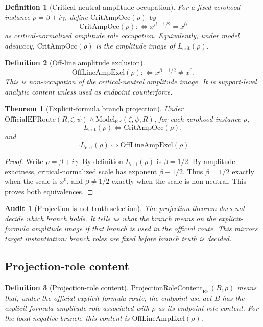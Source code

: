 \documentclass[11pt]{article}
\newtheorem{definition}{Definition}[section]
\newtheorem{theorem}{Theorem}[section]
\newtheorem{audit}{Audit}[section]
\newcommand{\Lcrit}{L_{\mathrm{crit}}}
\newcommand{\ModelEF}{\mathrm{Model}_{\mathrm{EF}}}
\newcommand{\OfficialEFRoute}{\mathrm{OfficialEFRoute}}
\newcommand{\CritAmpOcc}{\mathrm{CritAmpOcc}}
\newcommand{\OffAmpExcl}{\mathrm{OffLineAmpExcl}}
\newcommand{\ProjRoleEF}{\mathrm{ProjectionRoleContent}_{\mathrm{EF}}}
\begin{document}
\begin{definition}[Critical-neutral amplitude occupation]
For a fixed zerohood instance \(\rho=\beta+i\gamma\), define \(\CritAmpOcc(\rho)\) by
\[
\CritAmpOcc(\rho) :\Longleftrightarrow x^{\beta-1/2}=x^0
\]
as critical-normalized amplitude role occupation.  Equivalently, under model adequacy, \(\CritAmpOcc(\rho)\) is the amplitude image of \(\Lcrit(\rho)\).
\end{definition}

\begin{definition}[Off-line amplitude exclusion]
\[
\OffAmpExcl(\rho):\Longleftrightarrow x^{\beta-1/2}\ne x^0.
\]
This is non-occupation of the critical-neutral amplitude image.  It is support-level analytic content unless used as endpoint counterforce.
\end{definition}

\begin{theorem}[Explicit-formula branch projection]
Under \(\OfficialEFRoute(R,\zeta,\psi)\wedge \ModelEF(\zeta,\psi,R)\), for each zerohood instance \(\rho\),
\[
\Lcrit(\rho)\Longleftrightarrow \CritAmpOcc(\rho),
\]
and
\[
\neg\Lcrit(\rho)\Longleftrightarrow \OffAmpExcl(\rho).
\]
\end{theorem}

\begin{proof}
Write \(\rho=\beta+i\gamma\).  By definition \(\Lcrit(\rho)\) is \(\beta=1/2\).  By amplitude exactness, critical-normalized scale has exponent \(\beta-1/2\).  Thus \(\beta=1/2\) exactly when the scale is \(x^0\), and \(\beta\ne 1/2\) exactly when the scale is non-neutral.  This proves both equivalences.
\end{proof}

\begin{audit}[Projection is not truth selection]
The projection theorem does not decide which branch holds.  It tells us what the branch means on the explicit-formula amplitude image if that branch is used in the official route.  This mirrors target instantiation: branch roles are fixed before branch truth is decided.
\end{audit}

\subsection{Projection-role content}

\begin{definition}[Projection-role content]
\(\ProjRoleEF(B,\rho)\) means that, under the official explicit-formula route, the endpoint-use act \(B\) has the explicit-formula amplitude role associated with \(\rho\) as its endpoint-role content.  For the local negative branch, this content is \(\OffAmpExcl(\rho)\).
\end{definition}
\end{document}
